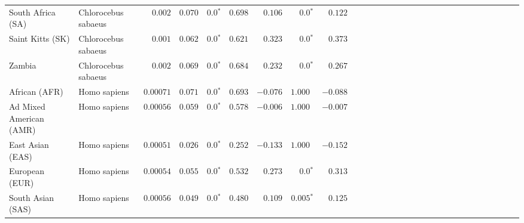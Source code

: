 \begin{center}
\begin{adjustbox}{width = 1\textwidth}
\begin{tabular}{|l|l|r|r|r|r|r|r|r|r|r|r|r|r|r|r|r|r|r|r|r|r|r|r|r|r|r|r|r|}
              South Africa (SA) &  Chlorocebus sabaeus &           $ 0.002$ &                      $ 0.070$ &                  $\bm{0.0{^*}}$ &                                           $ 0.698$ &                      $ 0.106$ &                  $\bm{0.0{^*}}$ &                                           $ 0.122$ \\
               Saint Kitts (SK) &  Chlorocebus sabaeus &           $ 0.001$ &                      $ 0.062$ &                  $\bm{0.0{^*}}$ &                                           $ 0.621$ &                      $ 0.323$ &                  $\bm{0.0{^*}}$ &                                           $ 0.373$ \\
                         Zambia &  Chlorocebus sabaeus &           $ 0.002$ &                      $ 0.069$ &                  $\bm{0.0{^*}}$ &                                           $ 0.684$ &                      $ 0.232$ &                  $\bm{0.0{^*}}$ &                                           $ 0.267$ \\
                  African (AFR) &         Homo sapiens &          $0.00071$ &                      $ 0.071$ &                  $\bm{0.0{^*}}$ &                                           $ 0.693$ &                      $-0.076$ &                      $ 1.000~~$ &                                           $-0.088$ \\
        Ad Mixed American (AMR) &         Homo sapiens &          $0.00056$ &                      $ 0.059$ &                  $\bm{0.0{^*}}$ &                                           $ 0.578$ &                      $-0.006$ &                      $ 1.000~~$ &                                           $-0.007$ \\
               East Asian (EAS) &         Homo sapiens &          $0.00051$ &                      $ 0.026$ &                  $\bm{0.0{^*}}$ &                                           $ 0.252$ &                      $-0.133$ &                      $ 1.000~~$ &                                           $-0.152$ \\
                 European (EUR) &         Homo sapiens &          $0.00054$ &                      $ 0.055$ &                  $\bm{0.0{^*}}$ &                                           $ 0.532$ &                      $ 0.273$ &                  $\bm{0.0{^*}}$ &                                           $ 0.313$ \\
              South Asian (SAS) &         Homo sapiens &          $0.00056$ &                      $ 0.049$ &                  $\bm{0.0{^*}}$ &                                           $ 0.480$ &                      $ 0.109$ &               $\bm{ 0.005{^*}}$ &                                           $ 0.125$ \\
\bottomrule
\end{tabular}
\end{adjustbox}
\end{center}
\newpage
